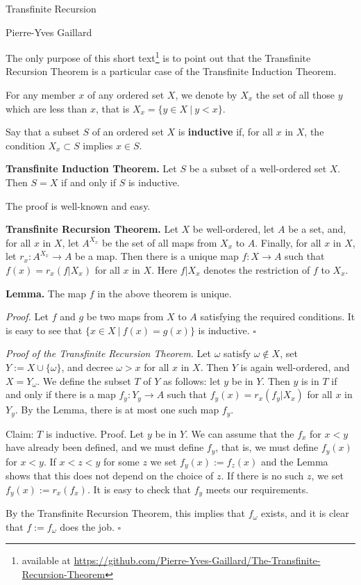 \documentclass[12pt,letterpaper]{article}
\newcommand{\nn}{\noindent}
\begin{document}
\begin{center}
{\Huge Transfinite Recursion}\bigskip 

Pierre-Yves Gaillard
\end{center}

\nn The only purpose of this short text\footnote{available at \url{https://github.com/Pierre-Yves-Gaillard/The-Transfinite-Recursion-Theorem}} is to point out that the Transfinite Recursion Theorem is a particular case of the Transfinite Induction Theorem. 

For any member $x$ of any ordered set $X$, we denote by $X_x$ the set of all those $y$ which are less than $x$, that is $X_x=\{y\in X\ |\ y<x\}$. 

Say that a subset $S$ of an ordered set $X$ is \textbf{inductive} if, for all $x$ in $X$, the condition $X_x\subset S$ implies $x\in S$. 

\nn\textbf{Transfinite Induction Theorem.} Let $S$ be a subset of a well-ordered set $X$. Then $S=X$ if and only if $S$ is inductive. 

The proof is well-known and easy. 

\nn\textbf{Transfinite Recursion Theorem.} Let $X$ be well-ordered, let $A$ be a set, and, for all $x$ in $X$, let $A^{X_x}$ be the set of all maps from $X_x$ to $A$. Finally, for all $x$ in $X$, let $r_x:A^{X_x}\to A$ be a map. Then there is a unique map $f:X\to A$ such that $f(x)=r_x(f|X_x)$ for all $x$ in $X$. Here $f|X_x$ denotes the restriction of $f$ to $X_x$. 

\nn\textbf{Lemma.} The map $f$ in the above theorem is unique. 

\nn\emph{Proof.} Let $f$ and $g$ be two maps from $X$ to $A$ satisfying the required conditions. It is easy to see that $\{x\in X\ |\ f(x)=g(x)\}$ is inductive. $\square$ 

\nn\emph{Proof of the Transfinite Recursion Theorem.} Let $\omega$ satisfy $\omega\notin X$, set $Y:=X\cup\{\omega\}$, and decree $\omega>x$ for all $x$ in $X$. Then $Y$ is again well-ordered, and $X=Y_\omega$. We define the subset $T$ of $Y$ as follows: let $y$ be in $Y$. Then $y$ is in $T$ if and only if there is a map $f_y:Y_y\to A$ such that $f_y(x)=r_x(f_y|X_x)$ for all $x$ in $Y_y$. By the Lemma, there is at most one such map $f_y$. 

\nn Claim: $T$ is inductive. Proof. Let $y$ be in $Y$. We can assume that the $f_x$ for $x<y$ have already been defined, and we must define $f_y$, that is, we must define $f_y(x)$ for $x<y$. If $x<z<y$ for some $z$ we set $f_y(x):=f_z(x)$ and the Lemma shows that this does not depend on the choice of $z$. If there is no such $z$, we set $f_y(x):=r_x(f_x)$. It is easy to check that $f_y$ meets our requirements. 

By the Transfinite Recursion Theorem, this implies that $f_\omega$ exists, and it is clear that $f:=f_\omega$ does the job. $\square$ 
\end{document}
